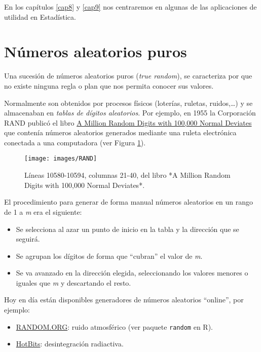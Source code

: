 \documentclass[
]{book}
\theoremstyle{break}
\theoremstyle{definition}
\theoremstyle{definition}
\theoremstyle{definition}
\theoremstyle{remark}
\begin{document}
En los capítulos \ref{cap8} y \ref{cap9} nos centraremos en algunas de las aplicaciones de utilidad en Estadística.

\hypertarget{nuxfameros-aleatorios-puros}{%
\section{Números aleatorios puros}\label{nuxfameros-aleatorios-puros}}

Una sucesión de números aleatorios puros (\emph{true random}), se caracteriza por que no existe ninguna regla o plan que nos permita conocer sus valores.

Normalmente son obtenidos por procesos físicos
(loterías, ruletas, ruidos,\ldots) y se almacenaban en \emph{tablas de dígitos aleatorios}.
Por ejemplo, en 1955 la Corporación RAND publicó el libro \href{https://www.rand.org/pubs/monograph_reports/MR1418.html}{A Million Random Digits with 100,000 Normal Deviates} que contenía números aleatorios generados mediante una ruleta electrónica conectada a una computadora (ver Figura \ref{fig:randbook}).

\begin{figure}[!htb]

{\centering \texttt{[image: images/RAND]} 

}

\caption{Líneas 10580-10594, columnas 21-40, del libro *A Million Random Digits with 100,000 Normal Deviates*.}\label{fig:randbook}
\end{figure}

El procedimiento para generar de forma manual números aleatorios
en un rango de 1 a \emph{m} era el siguiente:

\begin{itemize}
\item
  Se selecciona al azar un punto de inicio en la tabla
  y la dirección que se seguirá.
\item
  Se agrupan los dígitos de forma que ``cubran'' el valor de \emph{m}.
\item
  Se va avanzado en la dirección elegida, seleccionando los valores menores o iguales que \emph{m} y descartando el resto.
\end{itemize}

Hoy en día están disponibles generadores de números aleatorios ``online'', por ejemplo:

\begin{itemize}
\item
  \href{http://www.random.org/integers}{RANDOM.ORG}: ruido atmosférico
  (ver paquete \texttt{random} en R).
\item
  \href{http://www.fourmilab.ch/hotbits}{HotBits}: desintegración radiactiva.
\end{itemize}
\end{document}
